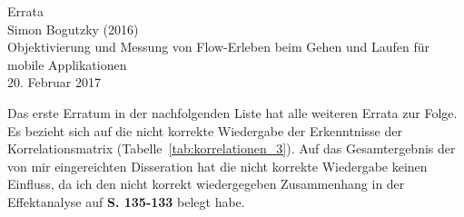 \documentclass[12pt, twoside=semi, DIV=calc, pagesize, parskip=half, listof=totoc, bibliography=totoc, open=right, listof=nochaptergap, pointlessnumbers, final]{scrreprt}
\begin{document}

\begin{center}
\Huge Errata\\
\vspace{5mm}
\normalsize Simon Bogutzky (2016)\\
\normalsize Objektivierung und Messung von Flow-Erleben beim Gehen und Laufen für mobile Applikationen\\
\vspace{5mm}
\normalsize 20. Februar 2017\\
\end{center}

Das erste Erratum in der nachfolgenden Liste hat alle weiteren Errata zur Folge. Es bezieht sich auf die nicht korrekte Wiedergabe der Erkenntnisse der Korrelationsmatrix (Tabelle~\ref{tab:korrelationen_3}). Auf das Gesamtergebnis der von mir eingereichten Disseration hat die nicht korrekte Wiedergabe keinen Einfluss, da ich den nicht korrekt wiedergegeben Zusammenhang in der Effektanalyse auf \textbf{S. 135-133} belegt habe.
\end{document}
